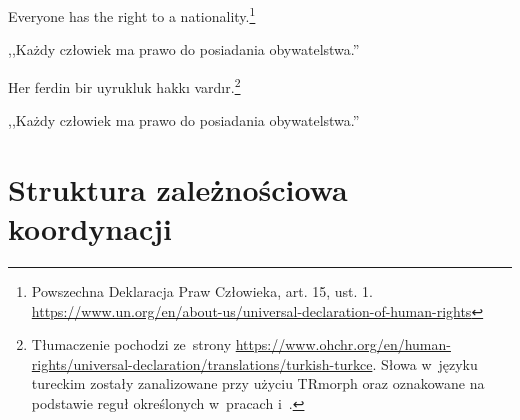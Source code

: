\begin{exe}
\ex \label{inicjalne}
Everyone has the right to a nationality.\footnote{Powszechna Deklaracja Praw Człowieka, art. 15, ust. 1. \url{https://www.un.org/en/about-us/universal-declaration-of-human-rights}}

,,Każdy człowiek ma prawo do posiadania obywatelstwa.''

\ex \label{finalne}
Her ferdin bir uyrukluk hakkı vardır.\footnote{Tłumaczenie pochodzi ze~strony \url{https://www.ohchr.org/en/human-rights/universal-declaration/translations/turkish-turkce}. Słowa w~języku tureckim zostały zanalizowane przy użyciu TRmorph \citep{coltekin2010freely} oraz oznakowane na podstawie reguł określonych w~pracach \cite{haspelmath2014leipzig} i~\cite{bedir2021overcoming}.}

,,Każdy człowiek ma prawo do posiadania obywatelstwa.''
\end{exe}

\section{Struktura zależnościowa koordynacji}

